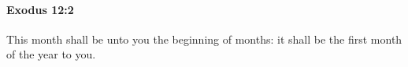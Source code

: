 
		\paragraph{Exodus 12:2} %
			\label{EXODUS-12-2}

			This month shall be unto you the beginning of months: it shall be the first month of the year to you.


